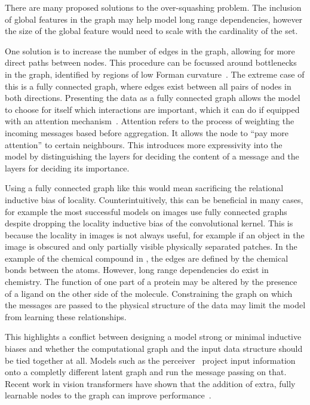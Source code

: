 There are many proposed solutions to the over-squashing problem.
The inclusion of global features in the graph may help model long range dependencies, however the size of the global feature would need to scale with the cardinality of the set.

One solution is to increase the number of edges in the graph, allowing for more direct paths between nodes.
This procedure can be focussed around bottlenecks in the graph, identified by regions of low Forman curvature~.
The extreme case of this is a fully connected graph, where edges exist between all pairs of nodes in both directions.
Presenting the data as a fully connected graph allows the model to choose for itself which interactions are important, which it can do if equipped with an attention mechanism~.
Attention refers to the process of weighting the incoming messages based before aggregation.
It allows the node to ``pay more attention'' to certain neighbours.
This introduces more expressivity into the model by distinguishing the layers for deciding the content of a message and the layers for deciding its importance.

Using a fully connected graph like this would mean sacrificing the relational inductive bias of locality.
Counterintuitively, this can be beneficial in many cases, for example the most successful models on images use fully connected graphs~ despite dropping the locality inductive bias of the convolutional kernel.
This is because the locality in images is not always useful, for example if an object in the image is obscured and only partially visible physically separated patches.
In the example of the chemical compound in , the edges are defined by the chemical bonds between the atoms.
However, long range dependencies do exist in chemistry.
The function of one part of a protein may be altered by the presence of a ligand on the other side of the molecule.
Constraining the graph on which the messages are passed to the physical structure of the data may limit the model from learning these relationships.

This highlights a conflict between designing a model strong or minimal inductive biases and whether the computational graph and the input data structure should be tied together at all.
Models such as the perceiver~ project input information onto a completly different latent graph and run the message passing on that.
Recent work in vision transformers have shown that the addition of extra, fully learnable nodes to the graph can improve performance~.

